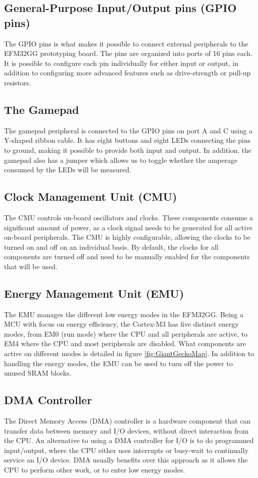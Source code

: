 \subsection{General-Purpose Input/Output pins (GPIO pins)}
The GPIO pins is what makes it possible to connect external peripherals to the EFM32GG prototyping board. The pins are organized into ports of 16 pins each. It is possible to configure each pin individually for either input or output, in addition to configuring more advanced features such as drive-strength or pull-up resistors.

\subsection{The Gamepad}
The gamepad peripheral is connected to the GPIO pins on port A and C using a Y-shaped ribbon cable. It has eight buttons and eight LEDs connecting the pins to ground, making it possible to provide both input and output. In addition, the gamepad also has a jumper which allows us to toggle whether the amperage consumed by the LEDs will be measured.

\subsection{Clock Management Unit (CMU)}
The CMU controls on-board oscillators and clocks. These components consume a significant amount of power, as a clock signal needs to be generated for all active on-board peripherals. The CMU is highly configurable, allowing the clocks to be turned on and off on an individual basis. By default, the clocks for all components are turned off and need to be manually enabled for the components that will be used.\cite{EFM32GG-RM}

\subsection{Energy Management Unit (EMU)}
The EMU manages the different low energy modes in the EFM32GG. Being a MCU with focus on energy efficiency, the Cortex-M3 has five distinct energy modes, from EM0 (run mode) where the CPU and all peripherals are active, to EM4 where the CPU and most peripherals are disabled. What components are active on different modes is detailed in figure \ref{fig:GiantGeckoMap}. In addition to handling the energy modes, the EMU can be used to turn off the power to unused SRAM blocks.\cite{EFM32GG-RM}

\subsection{DMA Controller}
The Direct Memory Access (DMA) controller is a hardware component that can transfer data between memory and I/O devices, without direct interaction from the CPU. An alternative to using a DMA controller for I/O is to do programmed input/output, where the CPU either uses interrupts or busy-wait to continually service an I/O device. DMA usually benefits over this approach as it allows the CPU to perform other work, or to enter low energy modes.

